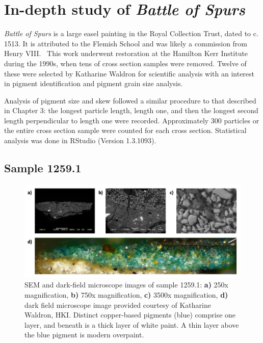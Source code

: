 
\chapter{In-depth study of \textit{Battle of Spurs}}

\textit{Battle of Spurs} is a large easel painting in the Royal Collection Trust, dated to c. 1513. It is attributed to the Flemish School and was likely a commission from Henry VIII.~\autocite{rct} This work underwent restoration at the Hamilton Kerr Institute during the 1990s, when tens of cross section samples were removed. Twelve of these were selected by Katharine Waldron for scientific analysis with an interest in pigment identification and pigment grain size analysis. 

Analysis of pigment size and skew followed a similar procedure to that described in Chapter 3: the longest particle length, length one, and then the longest second length perpendicular to length one were recorded. Approximately 300 particles or the entire cross section sample were counted for each cross section. Statistical analysis was done in RStudio (Version 1.3.1093).


\section{Sample 1259.1}


\begin{figure}[H]
  \centering
  \includegraphics[width=0.8\linewidth]{1259.1_imgs}
\caption[SEM and dark-field microscope images of sample 1259.1.]{SEM and dark-field microscope images of sample 1259.1: \textbf{a)} 250x magnification, \textbf{b)} 750x magnification, \textbf{c)} 3500x magnification, \textbf{d)} dark field microscope image provided courtesy of Katharine Waldron, HKI. Distinct copper-based pigments (blue) comprise one layer, and beneath is a thick layer of white paint. A thin layer above the blue pigment is modern overpaint.}
\label{fig:1259.1_imgs}
\end{figure}

